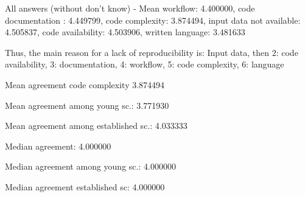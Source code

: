 
All answers (without don't know) -  Mean workflow: 4.400000, code documentation : 4.449799, code complexity: 3.874494, input data not available: 4.505837, code availability: 4.503906, written language: 3.481633

Thus, the main reason for a lack of reproducibility is: Input data, then 2: code availability, 3: documentation, 4: workflow, 5: code complexity, 6: language

Mean agreement code complexity 3.874494

Mean agreement among young sc.: 3.771930

Mean agreement among established sc.: 4.033333

Median agreement: 4.000000

Median agreement among young sc.: 4.000000

Median agreement established sc: 4.000000
